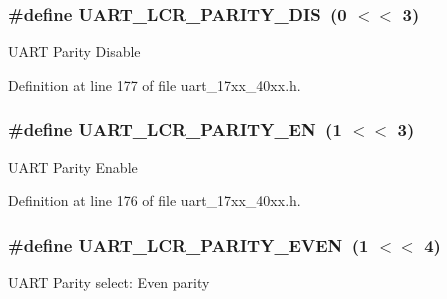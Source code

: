 \subsubsection[{\texorpdfstring{U\+A\+R\+T\+\_\+\+L\+C\+R\+\_\+\+P\+A\+R\+I\+T\+Y\+\_\+\+D\+IS}{UART_LCR_PARITY_DIS}}]{\setlength{\rightskip}{0pt plus 5cm}\#define U\+A\+R\+T\+\_\+\+L\+C\+R\+\_\+\+P\+A\+R\+I\+T\+Y\+\_\+\+D\+IS~(0 $<$$<$ 3)}\hypertarget{group__UART__17XX__40XX_ga91bc2978f5af5ac9a1f18af284275b39}{}\label{group__UART__17XX__40XX_ga91bc2978f5af5ac9a1f18af284275b39}
U\+A\+RT Parity Disable 

Definition at line 177 of file uart\+\_\+17xx\+\_\+40xx.\+h.

\subsubsection[{\texorpdfstring{U\+A\+R\+T\+\_\+\+L\+C\+R\+\_\+\+P\+A\+R\+I\+T\+Y\+\_\+\+EN}{UART_LCR_PARITY_EN}}]{\setlength{\rightskip}{0pt plus 5cm}\#define U\+A\+R\+T\+\_\+\+L\+C\+R\+\_\+\+P\+A\+R\+I\+T\+Y\+\_\+\+EN~(1 $<$$<$ 3)}\hypertarget{group__UART__17XX__40XX_ga4fba4b3d639bdfa713d12466d411f57c}{}\label{group__UART__17XX__40XX_ga4fba4b3d639bdfa713d12466d411f57c}
U\+A\+RT Parity Enable 

Definition at line 176 of file uart\+\_\+17xx\+\_\+40xx.\+h.

\subsubsection[{\texorpdfstring{U\+A\+R\+T\+\_\+\+L\+C\+R\+\_\+\+P\+A\+R\+I\+T\+Y\+\_\+\+E\+V\+EN}{UART_LCR_PARITY_EVEN}}]{\setlength{\rightskip}{0pt plus 5cm}\#define U\+A\+R\+T\+\_\+\+L\+C\+R\+\_\+\+P\+A\+R\+I\+T\+Y\+\_\+\+E\+V\+EN~(1 $<$$<$ 4)}\hypertarget{group__UART__17XX__40XX_ga48df31af63d9e3a65b13a32880bb0b36}{}\label{group__UART__17XX__40XX_ga48df31af63d9e3a65b13a32880bb0b36}
U\+A\+RT Parity select\+: Even parity 


